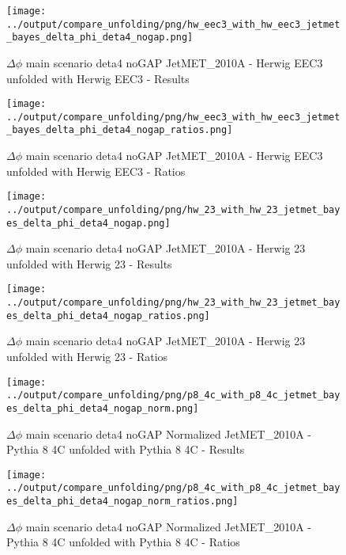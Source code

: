 \documentclass[11pt]{book}
\begin{document}
\begin{figure}[ht]
\centering
\texttt{[image: ../output/compare\_unfolding/png/hw\_eec3\_with\_hw\_eec3\_jetmet\_bayes\_delta\_phi\_deta4\_nogap.png]}
\caption{$\Delta\phi$ main scenario deta4 noGAP JetMET\_2010A - Herwig EEC3 unfolded with Herwig EEC3 - Results}
\label{hw_eec3_hw_eec3_jetmet_bayes_delta_phi_deta4_nogap_a}
\end{figure}

\begin{figure}[ht]
\centering
\texttt{[image: ../output/compare\_unfolding/png/hw\_eec3\_with\_hw\_eec3\_jetmet\_bayes\_delta\_phi\_deta4\_nogap\_ratios.png]}
\caption{$\Delta\phi$ main scenario deta4 noGAP JetMET\_2010A - Herwig EEC3 unfolded with Herwig EEC3 - Ratios}
\label{hw_eec3_hw_eec3_jetmet_bayes_delta_phi_deta4_nogap_b}
\end{figure}

\begin{figure}[ht]
\centering
\texttt{[image: ../output/compare\_unfolding/png/hw\_23\_with\_hw\_23\_jetmet\_bayes\_delta\_phi\_deta4\_nogap.png]}
\caption{$\Delta\phi$ main scenario deta4 noGAP JetMET\_2010A - Herwig 23 unfolded with Herwig 23 - Results}
\label{hw_23_hw_23_jetmet_bayes_delta_phi_deta4_nogap_a}
\end{figure}

\begin{figure}[ht]
\centering
\texttt{[image: ../output/compare\_unfolding/png/hw\_23\_with\_hw\_23\_jetmet\_bayes\_delta\_phi\_deta4\_nogap\_ratios.png]}
\caption{$\Delta\phi$ main scenario deta4 noGAP JetMET\_2010A - Herwig 23 unfolded with Herwig 23 - Ratios}
\label{hw_23_hw_23_jetmet_bayes_delta_phi_deta4_nogap_b}
\end{figure}



\begin{figure}[ht]
\centering
\texttt{[image: ../output/compare\_unfolding/png/p8\_4c\_with\_p8\_4c\_jetmet\_bayes\_delta\_phi\_deta4\_nogap\_norm.png]}
\caption{$\Delta\phi$ main scenario deta4 noGAP Normalized JetMET\_2010A - Pythia 8 4C unfolded with Pythia 8 4C - Results}
\label{p8_p8_jetmet_bayes_delta_phi_deta4_nogap_norm_a}
\end{figure}

\begin{figure}[ht]
\centering
\texttt{[image: ../output/compare\_unfolding/png/p8\_4c\_with\_p8\_4c\_jetmet\_bayes\_delta\_phi\_deta4\_nogap\_norm\_ratios.png]}
\caption{$\Delta\phi$ main scenario deta4 noGAP Normalized JetMET\_2010A - Pythia 8 4C unfolded with Pythia 8 4C - Ratios}
\label{p8_p8_jetmet_bayes_delta_phi_deta4_nogap_norm_b}
\end{figure}
\end{document}
